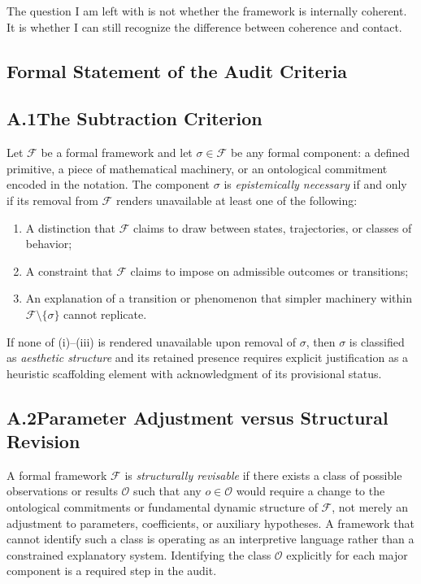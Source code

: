 \documentclass[12pt, a4paper]{article}
\begin{document}
The question I am left with is not whether the framework is internally coherent. It is whether I can still recognize the difference between coherence and contact.


\begin{appendices}
\renewcommand{\thesection}{A}
\section{Formal Statement of the Audit Criteria}

\subsection*{A.1\quad The Subtraction Criterion}

Let $\mathcal{F}$ be a formal framework and let $\sigma \in \mathcal{F}$ be any formal component: a defined primitive, a piece of mathematical machinery, or an ontological commitment encoded in the notation. The component $\sigma$ is \textit{epistemically necessary} if and only if its removal from $\mathcal{F}$ renders unavailable at least one of the following:

\begin{enumerate}
  \item[(i)] A distinction that $\mathcal{F}$ claims to draw between states, trajectories, or classes of behavior;
  \item[(ii)] A constraint that $\mathcal{F}$ claims to impose on admissible outcomes or transitions;
  \item[(iii)] An explanation of a transition or phenomenon that simpler machinery within $\mathcal{F} \setminus \{\sigma\}$ cannot replicate.
\end{enumerate}

\noindent If none of (i)--(iii) is rendered unavailable upon removal of $\sigma$, then $\sigma$ is classified as \textit{aesthetic structure} and its retained presence requires explicit justification as a heuristic scaffolding element with acknowledgment of its provisional status.

\subsection*{A.2\quad Parameter Adjustment versus Structural Revision}

A formal framework $\mathcal{F}$ is \textit{structurally revisable} if there exists a class of possible observations or results $\mathcal{O}$ such that any $o \in \mathcal{O}$ would require a change to the ontological commitments or fundamental dynamic structure of $\mathcal{F}$, not merely an adjustment to parameters, coefficients, or auxiliary hypotheses. A framework that cannot identify such a class is operating as an interpretive language rather than a constrained explanatory system. Identifying the class $\mathcal{O}$ explicitly for each major component is a required step in the audit.


\end{appendices}
\end{document}

